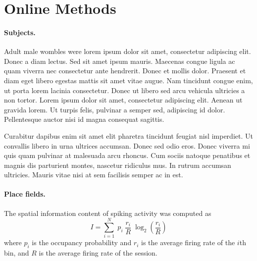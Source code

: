 
\section*{Online Methods}

\paragraph{Subjects.} 
  Adult male wombles were lorem ipsum dolor sit amet, consectetur adipiscing elit. Donec a diam lectus. Sed sit amet ipsum mauris. Maecenas congue ligula ac quam viverra nec consectetur ante hendrerit. Donec et mollis dolor. Praesent et diam eget libero egestas mattis sit amet vitae augue. Nam tincidunt congue enim, ut porta lorem lacinia consectetur. Donec ut libero sed arcu vehicula ultricies a non tortor. Lorem ipsum dolor sit amet, consectetur adipiscing elit. Aenean ut gravida lorem. Ut turpis felis, pulvinar a semper sed, adipiscing id dolor. Pellentesque auctor nisi id magna consequat sagittis. 

Curabitur dapibus enim sit amet elit pharetra tincidunt feugiat nisl imperdiet. Ut convallis libero in urna ultrices accumsan. Donec sed odio eros. Donec viverra mi quis quam pulvinar at malesuada arcu rhoncus. Cum sociis natoque penatibus et magnis dis parturient montes, nascetur ridiculus mus. In rutrum accumsan ultricies. Mauris vitae nisi at sem facilisis semper ac in est.

\paragraph{Place fields.}
The spatial information content\cite{SkagMcNa93a} of spiking activity was computed as
\begin{equation}
  I=\sum_{i=1}^{N} \; p_i \; \frac{r_i}{R} \; \log_2\left(\frac{r_i}{R}\right)
  \label{eq:skaggs}
\end{equation}
where $p_i$ is the occupancy probability and $r_i$ is the average firing rate of the $i$th bin, and $R$ is the average firing rate of the session. 

